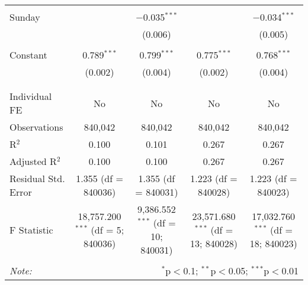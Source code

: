\documentclass[
]{article}
\begin{document}
\begin{table}[!htbp]
{\begin{tabular}{@{\extracolsep{5pt}}lcccc}
  & & & & \\ 
 Sunday &  & $-$0.035$^{***}$ &  & $-$0.034$^{***}$ \\ 
  &  & (0.006) &  & (0.005) \\ 
  & & & & \\ 
 Constant & 0.789$^{***}$ & 0.799$^{***}$ & 0.775$^{***}$ & 0.768$^{***}$ \\ 
  & (0.002) & (0.004) & (0.002) & (0.004) \\ 
  & & & & \\ 
\hline \\[-1.8ex] 
Individual FE & No & No & No & No \\ 
Observations & 840,042 & 840,042 & 840,042 & 840,042 \\ 
R$^{2}$ & 0.100 & 0.101 & 0.267 & 0.267 \\ 
Adjusted R$^{2}$ & 0.100 & 0.100 & 0.267 & 0.267 \\ 
Residual Std. Error & 1.355 (df = 840036) & 1.355 (df = 840031) & 1.223 (df = 840028) & 1.223 (df = 840023) \\ 
F Statistic & 18,757.200$^{***}$ (df = 5; 840036) & 9,386.552$^{***}$ (df = 10; 840031) & 23,571.680$^{***}$ (df = 13; 840028) & 17,032.760$^{***}$ (df = 18; 840023) \\ 
\hline 
\hline \\[-1.8ex] 
\textit{Note:}  & \multicolumn{4}{r}{$^{*}$p$<$0.1; $^{**}$p$<$0.05; $^{***}$p$<$0.01} \\ 
\end{tabular}
} 
\end{table} 
\newpage
\end{document}
